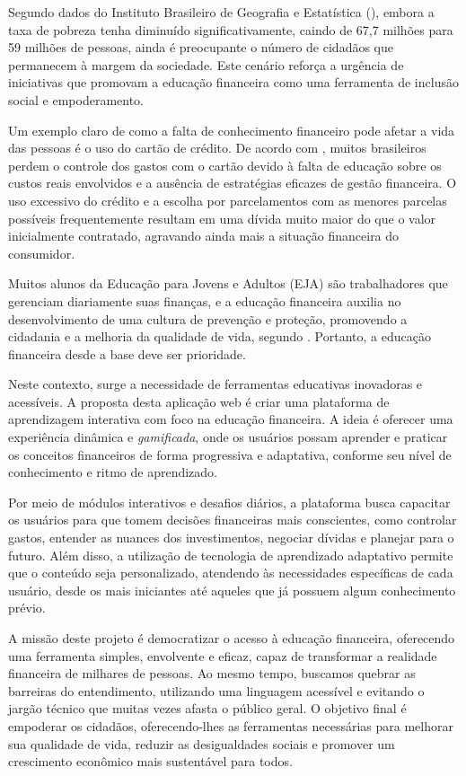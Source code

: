 \documentclass[
	article,			%
	12pt,				%
	oneside,			%
	a4paper,			%
	english,			%
	brazil,				%
	sumario=tradicional
	]{abntex2}
\begin{document}
Segundo dados do Instituto Brasileiro de Geografia e Estatística (), embora a taxa de pobreza tenha diminuído significativamente, caindo de 67,7 milhões para 59 milhões de pessoas, ainda é preocupante o número de cidadãos que permanecem à margem da sociedade. Este cenário reforça a urgência de iniciativas que promovam a educação financeira como uma ferramenta de inclusão social e empoderamento.

Um exemplo claro de como a falta de conhecimento financeiro pode afetar a vida das pessoas é o uso do cartão de crédito. De acordo com , muitos brasileiros perdem o controle dos gastos com o cartão devido à falta de educação sobre os custos reais envolvidos e a ausência de estratégias eficazes de gestão financeira. O uso excessivo do crédito e a escolha por parcelamentos com as menores parcelas possíveis frequentemente resultam em uma dívida muito maior do que o valor inicialmente contratado, agravando ainda mais a situação financeira do consumidor.

Muitos alunos da Educação para Jovens e Adultos (EJA) são trabalhadores que gerenciam diariamente suas finanças, e a educação financeira auxilia no desenvolvimento de uma cultura de prevenção e proteção, promovendo a cidadania e a melhoria da qualidade de vida, segundo . Portanto, a educação financeira desde a base deve ser prioridade.

Neste contexto, surge a necessidade de ferramentas educativas inovadoras e acessíveis. A proposta desta aplicação web é criar uma plataforma de aprendizagem interativa com foco na educação financeira. A ideia é oferecer uma experiência dinâmica e \textit{gamificada}, onde os usuários possam aprender e praticar os conceitos financeiros de forma progressiva e adaptativa, conforme seu nível de conhecimento e ritmo de aprendizado. 

Por meio de módulos interativos e desafios diários, a plataforma busca capacitar os usuários para que tomem decisões financeiras mais conscientes, como controlar gastos, entender as nuances dos investimentos, negociar dívidas e planejar para o futuro. Além disso, a utilização de tecnologia de aprendizado adaptativo permite que o conteúdo seja personalizado, atendendo às necessidades específicas de cada usuário, desde os mais iniciantes até aqueles que já possuem algum conhecimento prévio.

A missão deste projeto é democratizar o acesso à educação financeira, oferecendo uma ferramenta simples, envolvente e eficaz, capaz de transformar a realidade financeira de milhares de pessoas. Ao mesmo tempo, buscamos quebrar as barreiras do entendimento, utilizando uma linguagem acessível e evitando o jargão técnico que muitas vezes afasta o público geral. O objetivo final é empoderar os cidadãos, oferecendo-lhes as ferramentas necessárias para melhorar sua qualidade de vida, reduzir as desigualdades sociais e promover um crescimento econômico mais sustentável para todos.
\end{document}
